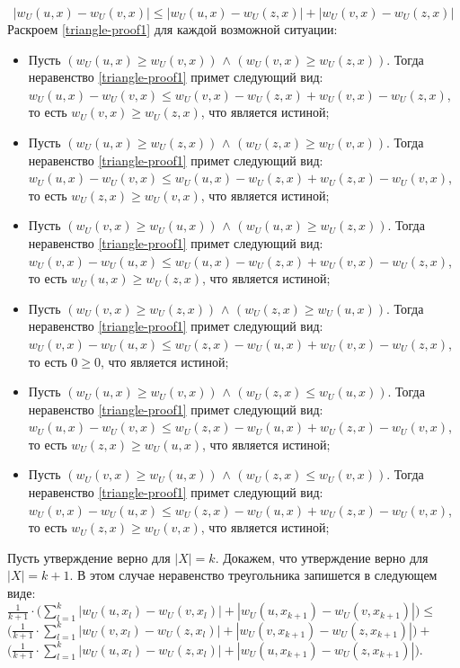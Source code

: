 \begin{equation}\label{triangle-proof1}
|w_U(u,x) - w_U(v,x)| \le |w_U(u,x) - w_U(z,x)| + |w_U(v,x) - w_U(z,x)|
\end{equation}
Раскроем \ref{triangle-proof1} для каждой возможной ситуации:
\begin{itemize}
	\item Пусть $(w_U(u,x) \ge w_U(v,x))$ $\wedge$ $(w_U(v,x) \ge w_U(z,x))$.
Тогда  неравенство \ref{triangle-proof1} примет следующий вид:
$w_U(u,x) - w_U(v,x) \le w_U(v,x) - w_U(z,x) + w_U(v,x) - w_U(z,x)$, то есть
$w_U(v,x) \ge w_U(z,x)$, что является истиной;


\item Пусть $(w_U(u,x) \ge w_U(z,x))$ $\wedge$ $(w_U(z,x) \ge w_U(v,x))$.
Тогда  неравенство \ref{triangle-proof1} примет следующий вид:
$w_U(u,x) - w_U(v,x) \le w_U(u,x) - w_U(z,x) + w_U(z,x) - w_U(v,x)$, то есть
$w_U(z,x) \ge w_U(v,x)$, что является истиной;

\item Пусть $(w_U(v,x) \ge w_U(u,x))$ $\wedge$ $(w_U(u,x) \ge w_U(z,x))$.
Тогда  неравенство \ref{triangle-proof1}
примет следующий вид:
	$w_U(v,x) - w_U(u,x) \le w_U(u,x) - w_U(z,x) + w_U(v,x) - w_U(z,x)$, то
		есть $w_U(u,x) \ge w_U(z,x)$, что является истиной;

	\item Пусть $(w_U(v,x) \ge w_U(z,x))$ $\wedge$ $(w_U(z,x) \ge w_U(u,x))$.
Тогда  неравенство \ref{triangle-proof1}
примет следующий вид:
	$w_U(v,x) - w_U(u,x) \le w_U(z,x) - w_U(u,x) + w_U(v,x) - w_U(z,x)$, то
		есть $0 \ge 0$, что является истиной;

\item Пусть
	$(w_U(u,x) \ge w_U(v,x))$ $\wedge$ $(w_U(z,x) \le w_U(u,x))$.
Тогда  неравенство \ref{triangle-proof1} примет следующий вид:
		$w_U(u,x) - w_U(v,x) \le w_U(z,x) - w_U(u,x) + w_U(z,x) - w_U(v,x)$, то
		есть
		$w_U(z,x) \ge w_U(u,x)$, что является истиной;

\item Пусть
	$(w_U(v,x) \ge w_U(u,x))$ $\wedge$ $(w_U(z,x) \le w_U(v,x))$.
Тогда  неравенство \ref{triangle-proof1} примет следующий вид:
		$w_U(v,x) - w_U(u,x) \le w_U(z,x) - w_U(u,x) + w_U(z,x) - w_U(v,x)$, то
		есть
		$w_U(z,x) \ge w_U(v,x)$, что является истиной;
\end{itemize}

Пусть утверждение верно для $|X| = k$. Докажем, что утверждение верно
для $|X| = k + 1$. В этом случае неравенство треугольника запишется в следующем
виде: \\
$\frac{1}{k+1} \cdot \Big(\sum \limits_{l=1}^{k} |w_U(u,x_l) - w_U(v,x_l)| +
|w_U(u,x_{k+1}) - w_U(v,x_{k+1})| \Big)\le$ \\
$\Big(\frac{1}{k+1} \cdot \sum \limits_{l=1}^{k} |w_U(v,x_l) - w_U(z,x_l)| +
|w_U(v,x_{k+1}) - w_U(z,x_{k+1})|\Big) +$\\
$\Big(\frac{1}{k+1} \cdot \sum \limits_{l=1}^{k} |w_U(u,x_l) - w_U(z,x_l)| + |w_U(u,x_{k+1}) - w_U(z,x_{k+1})|\Big)$.


